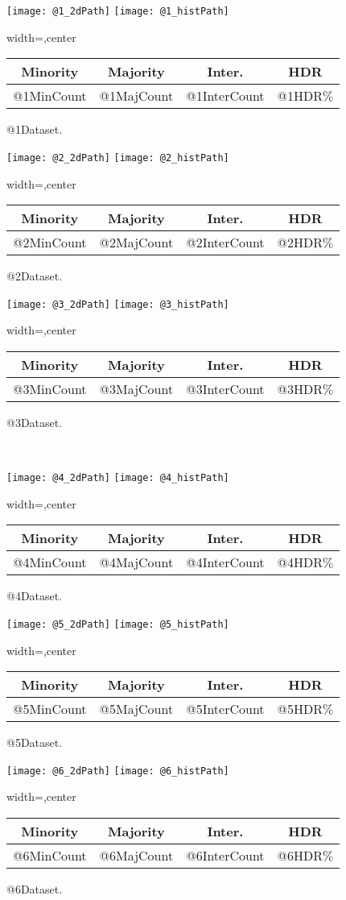 \documentclass[a4paper,12pt]{article}
\makeatletter
\newcommand{\image}[6]{%
  \begin{figure*}[h!]
  	\centering
  	\begin{subfigure}[t]{0.32\linewidth}	
  		\texttt{[image: @1\_2dPath]}
  		\texttt{[image: @1\_histPath]}
  		\begin{adjustbox}{width=\columnwidth,center}
  		\begin{tabular}{c|c|c|c}
  			Minority & Majority & Inter. & HDR  \\
  			\hline
  			@1MinCount  & @1MajCount  & @1InterCount & @1HDR\(\%\) \\
  		\end{tabular}
  		\end{adjustbox}
  		\caption{#1. }
  		\label{fig:RawData_hist}
  	\end{subfigure}
  	\hspace{0.1em}%
  	\begin{subfigure}[t]{0.32\linewidth}	
  		\texttt{[image: @2\_2dPath]}
  		\texttt{[image: @2\_histPath]}
  		\begin{adjustbox}{width=\columnwidth,center}
  		\begin{tabular}{c|c|c|c}
  			Minority & Majority & Inter. & HDR  \\
  			\hline
  			@2MinCount  & @2MajCount  & @2InterCount & @2HDR\(\%\) \\
  		\end{tabular}
  		\end{adjustbox}
  		\caption{#2. }
  		\label{fig:SIMPOR_hist}
  	\end{subfigure}
  	\hspace{0.1em}%
  	\begin{subfigure}[t]{0.32\linewidth}	
  		\texttt{[image: @3\_2dPath]}
  		\texttt{[image: @3\_histPath]}
  		\begin{adjustbox}{width=\columnwidth,center}
  		\begin{tabular}{c|c|c|c}
  			Minority & Majority & Inter. & HDR  \\
  			\hline
  			@3MinCount  & @3MajCount  & @3InterCount & @3HDR\(\%\) \\
  		\end{tabular}
  		\end{adjustbox}
  		\caption{#3. }
  		\label{fig:SMOTE_hist}
  	\end{subfigure}
  	\\ 
  	\begin{subfigure}[t]{0.32\linewidth}	
  		\texttt{[image: @4\_2dPath]}
  		\texttt{[image: @4\_histPath]}
		\begin{adjustbox}{width=\columnwidth,center}
  		\begin{tabular}{c|c|c|c}
  			Minority & Majority & Inter. & HDR  \\
  			\hline
  			@4MinCount  & @4MajCount  & @4InterCount & @4HDR\(\%\) \\
  		\end{tabular}
  	\end{adjustbox}
  		\caption{#4. }
  		\label{fig:#4}
  	\end{subfigure}
  	\hspace{0.1em}%
  	\begin{subfigure}[t]{0.32\linewidth}	
  		\texttt{[image: @5\_2dPath]}
  		\texttt{[image: @5\_histPath]}
		\begin{adjustbox}{width=\columnwidth,center}
  		\begin{tabular}{c|c|c|c}
  			Minority & Majority & Inter. & HDR  \\
  			\hline
  			@5MinCount  & @5MajCount  & @5InterCount & @5HDR\(\%\) \\
  		\end{tabular}
  	\end{adjustbox}
  		\caption{#5. }
  		\label{fig:#5}
  	\end{subfigure}
  	\hspace{0.1em}%
  	\begin{subfigure}[t]{0.32\linewidth}	
  		\texttt{[image: @6\_2dPath]}
  		\texttt{[image: @6\_histPath]}
		\begin{adjustbox}{width=\columnwidth,center}
  		\begin{tabular}{c|c|c|c}
  			Minority & Majority & Inter. & HDR  \\
  			\hline
  			@6MinCount  & @6MajCount  & @6InterCount & @6HDR\(\%\) \\
  		\end{tabular}
  	\end{adjustbox}
  		\caption{#6. }
  		\label{fig:#6}
  	\end{subfigure}
  	
  	\label{fig:visualization}

  	
  \end{figure*}
}
\makeatother
\begin{document}
\image{@1Dataset}{@2Dataset}{@3Dataset}{@4Dataset}{@5Dataset}{@6Dataset} 
\end{document}
